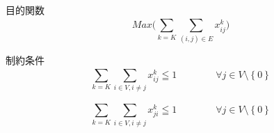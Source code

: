 目的関数
\begin{equation}
  Max\Bigg(\sum_{k=K}^{}\sum_{(i,j)\in E}^{}x_{ij}^{k}\Bigg) \tag{1}
\end{equation}

制約条件
\begin{equation}
  \sum_{k=K}^{}\sum_{i\in V,i\neq j}^{}x_{ij}^{k} \leqq 1
  \qquad\qquad\forall j \in V\setminus\left\{0 \right\} \tag{2}
\end{equation}

\begin{equation}
  \sum_{k=K}^{}\sum_{i\in V,i\neq j}^{}x_{ji}^{k} \leqq 1
  \qquad\qquad\forall j \in V\setminus\left\{0 \right\} \tag{3}
\end{equation}